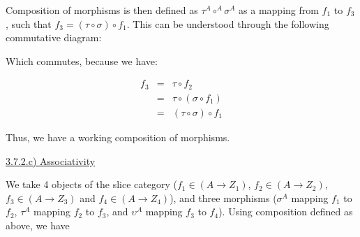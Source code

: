 
Composition of morphisms is then defined as $\tau^A \circ^A \sigma^A$ as a mapping from $f_1$ to $f_3$, such that $f_3 = (\tau \circ \sigma) \circ f_1$. This can be understood through the following commutative diagram:


Which commutes, because we have:

$$
\begin{aligned}
	f_3 &=&  \tau \circ                f_2  \\
		&=&  \tau \circ (\sigma  \circ f_1) \\
		&=& (\tau \circ  \sigma) \circ f_1
\end{aligned}
$$

Thus, we have a working composition of morphisms.

\vspace{5mm}
\underline{3.7.2.c) Associativity}

We take 4 objects of the slice category ($f_1 \in (A \to Z_1)$, $f_2 \in (A \to Z_2)$, $f_3 \in (A \to Z_3)$ and  $f_4 \in (A \to Z_4)$), and three morphisms ($\sigma^A$ mapping $f_1$ to $f_2$, $\tau^A$ mapping $f_2$ to $f_3$, and $\upsilon^A$ mapping $f_3$ to $f_4$). Using composition defined as above, we have

